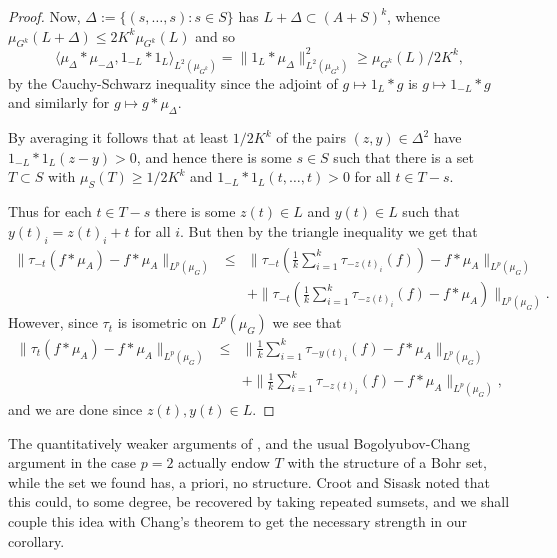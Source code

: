 \documentclass[12pt]{amsart}  %
\begin{document}
\begin{proof}
Now, $\Delta:=\{(s,\dots,s): s \in S\}$ has $L+\Delta  \subset (A+S)^k$, whence $\mu_{G^k}(L + \Delta) \leq 2K^k\mu_{G^k}(L)$ and so
\begin{equation*}
\langle \mu_\Delta \ast \mu_{-\Delta},1_{-L} \ast 1_{L}\rangle_{L^2(\mu_{G^k})} = \|1_L \ast \mu_\Delta \|_{L^2(\mu_{G^k})}^2\geq \mu_{G^k}(L)/2K^k,
\end{equation*}
by the Cauchy-Schwarz inequality since the adjoint of $g \mapsto 1_{L} \ast g$ is $g \mapsto 1_{-L} \ast g$ and similarly for $g \mapsto g \ast \mu_\Delta$.

By averaging it follows that at least $1/2K^k$ of the pairs $(z,y) \in \Delta^2$ have $1_{-L} \ast 1_{L}(z-y)>0$, and hence there is some $s \in S$ such that there is a set $T\subset S$ with $\mu_S(T) \geq 1/2K^k$ and $1_{-L} \ast 1_{L}(t,\dots,t)>0$ for all $t \in T-s$. 

Thus for each $t \in T-s$ there is some $z(t) \in L$ and $y(t) \in L$ such that $y(t)_i=z(t)_i+t$ for all $i$.  But then by the triangle inequality we get that
\begin{eqnarray*}
\|\tau_{-t}(f \ast \mu_A) - f \ast \mu_A\|_{L^p(\mu_G)}& \leq &\|\tau_{-t}\left(\frac{1}{k}\sum_{i=1}^k{\tau_{-z(t)_i}(f)}\right) -  f \ast \mu_A\|_{L^p(\mu_G)}\\&&+\|\tau_{-t}\left(\frac{1}{k}\sum_{i=1}^k{\tau_{-z(t)_i}(f)} - f \ast \mu_A \right)\|_{L^p(\mu_G)}.
\end{eqnarray*}
However, since $\tau_t$ is isometric on $L^p(\mu_G)$ we see that
\begin{eqnarray*}
\|\tau_t(f \ast \mu_A) - f \ast \mu_A\|_{L^p(\mu_G)} &\leq & \|\frac{1}{k}\sum_{i=1}^k{\tau_{-y(t)_i}(f)}-  f \ast \mu_A\|_{L^p(\mu_G)}\\&&+\|\frac{1}{k}\sum_{i=1}^k{\tau_{-z(t)_i}(f)} - f \ast \mu_A\|_{L^p(\mu_G)},
\end{eqnarray*}
and we are done since $z(t),y(t) \in L$.
\end{proof}
The quantitatively weaker arguments of \cite{bou::4}, and the usual Bogolyubov-Chang argument in the case $p=2$ actually endow $T$ with the structure of a Bohr set, while the set we found has, a priori, no structure.  Croot and Sisask noted that this could, to some degree, be recovered by taking repeated sumsets, and we shall couple this idea with Chang's theorem to get the necessary strength in our corollary.
\end{document}
